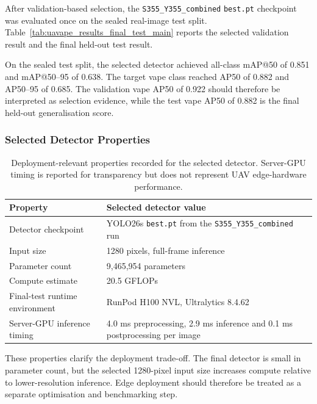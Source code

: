 After validation-based selection, the \texttt{S355\_Y355\_combined} \texttt{best.pt} checkpoint was evaluated once on the sealed real-image test split. Table~\ref{tab:uavape_results_final_test_main} reports the selected validation result and the final held-out test result.

\begin{table}[H]
\centering
\scriptsize
{}
\caption{Validation and sealed test results for the selected \texttt{S355\_Y355\_combined} recipe.}
\label{tab:uavape_results_final_test_main}
\end{table}

On the sealed test split, the selected detector achieved all-class mAP@50 of 0.851 and mAP@50--95 of 0.638. The target vape class reached AP50 of 0.882 and AP50--95 of 0.685. The validation vape AP50 of 0.922 should therefore be interpreted as selection evidence, while the test vape AP50 of 0.882 is the final held-out generalisation score.

\subsubsection{Selected Detector Properties}

\begin{table}[H]
\centering
\small
\begin{tabularx}{\textwidth}{p{} X}
\toprule
\textbf{Property} & \textbf{Selected detector value} \\
\midrule
Detector checkpoint & YOLO26s \texttt{best.pt} from the \texttt{S355\_Y355\_combined} run \\
Input size & 1280 pixels, full-frame inference \\
Parameter count & 9,465,954 parameters \\
Compute estimate & 20.5 GFLOPs \\
Final-test runtime environment & RunPod H100 NVL, Ultralytics 8.4.62 \\
Server-GPU inference timing & 4.0 ms preprocessing, 2.9 ms inference and 0.1 ms postprocessing per image \\
\bottomrule
\end{tabularx}
\caption{Deployment-relevant properties recorded for the selected detector. Server-GPU timing is reported for transparency but does not represent UAV edge-hardware performance.}
\label{tab:uavape_results_selected_detector_deployment_properties_main}
\end{table}

These properties clarify the deployment trade-off. The final detector is small in parameter count, but the selected 1280-pixel input size increases compute relative to lower-resolution inference. Edge deployment should therefore be treated as a separate optimisation and benchmarking step.

